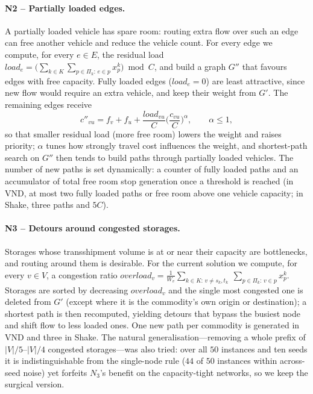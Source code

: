 \documentclass[runningheads]{llncs}
\newcommand{\E}{E}
\newcommand{\Vv}{V}
\begin{document}
\paragraph{N2 -- Partially loaded edges.}
A partially loaded vehicle has spare room: routing extra flow over such an edge
can free another vehicle and reduce the vehicle count. For every edge we
compute, for every $e\in \E$, the residual load $load_e=\big(\sum_{k\in
K}\sum_{p\in\Pi_k:\,e\in p} x^k_p\big) \bmod C$, and build a graph $G''$ that
favours edges with free capacity. Fully loaded
edges ($load_e=0$) are least attractive, since new flow would require an extra
vehicle, and keep their weight from $G'$. The remaining edges receive
\begin{equation}
c''_{vu}=f_v+f_u+\frac{load_{vu}}{C}\Big(\frac{c_{vu}}{C}\Big)^{\!\alpha},
\qquad \alpha\le 1,
\end{equation}
so that smaller residual load (more free room) lowers the weight and raises
priority; $\alpha$ tunes how strongly travel cost influences the weight, and
shortest-path search on $G''$ then tends to build paths through partially loaded
vehicles. The number of new paths is set dynamically: a counter of fully loaded
paths and an accumulator of total free room stop generation once a threshold is
reached (in VND, at most two fully loaded paths or free room above one vehicle
capacity; in Shake, three paths and $5C$).

\paragraph{N3 -- Detours around congested storages.}
Storages whose transshipment volume is at or near their capacity are
bottlenecks, and routing around them is desirable. For the current solution we
compute, for every $v\in \Vv$, a congestion ratio
$overload_v=\frac1{W_v}\sum_{k\in K:\,v\neq s_k,t_k}\ \sum_{p\in\Pi_k:\,v\in p}
x^k_p$. Storages are sorted by decreasing $overload_v$ and the single most
congested one is deleted from $G'$ (except where it is the commodity's own origin
or destination); a shortest path is then recomputed, yielding detours that bypass
the busiest node and shift flow to less loaded ones. One new path per commodity is
generated in VND and three in Shake. The natural generalisation---removing a whole
prefix of $|\Vv|/5$--$|\Vv|/4$ congested storages---was also tried: over all $50$
instances and ten seeds it is indistinguishable from the single-node rule ($44$ of
$50$ instances within across-seed noise) yet forfeits $N_3$'s benefit on the
capacity-tight networks, so we keep the surgical version.
\end{document}

